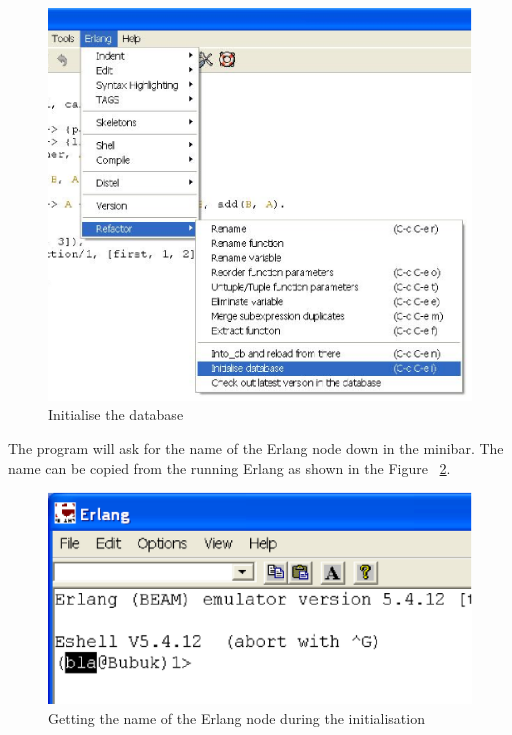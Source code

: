 \documentclass[12pt]{article}
\begin{document}
\begin{center}
\begin{figure}[htbp]
   
    \includegraphics[scale=0.60]{init.eps}
   \caption{Initialise the database}
  \label{init}
\end{figure}
\end{center}

The program will ask for the name of the Erlang node down in the minibar. 
The name can be copied from the running Erlang as shown in the Figure ~\ref{node}.

\begin{center}
\begin{figure}[htbp]

    \includegraphics[scale=0.60]{node.eps}
   \caption{Getting the name of the Erlang node during the initialisation}
  \label{node}
\end{figure}
\end{center}
\end{document}
